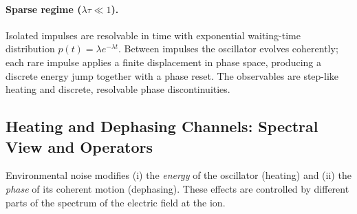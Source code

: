 \paragraph{Sparse regime ($\lambda\tau\!\ll\!1$).}
Isolated impulses are resolvable in time with exponential waiting-time
distribution $p(t)=\lambda e^{-\lambda t}$.  Between impulses the oscillator
evolves coherently; each rare impulse applies a finite displacement in
phase space, producing a discrete energy jump together with a phase reset.
The observables are step-like heating and discrete, resolvable phase
discontinuities.

\subsection*{Heating and Dephasing Channels: Spectral View and Operators}

Environmental noise modifies (i) the \emph{energy} of the oscillator
(heating) and (ii) the \emph{phase} of its coherent motion (dephasing).
These effects are controlled by different parts of the spectrum of the
electric field at the ion.

